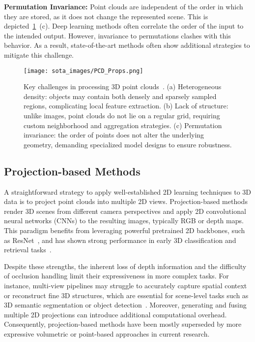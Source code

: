 \textbf{Permutation Invariance:} Point clouds are independent of the order
in which they are stored, as it does not change the represented scene.
This is depicted~\ref{fig:pcd_props}~(c).
Deep learning methods often correlate the order of the input to the
intended output. However, invariance to permutations clashes with this
behavior. As a result, state-of-the-art methods often show additional
strategies to mitigate this challenge.

\begin{figure}[t]
    \centering
    \texttt{[image: sota\_images/PCD\_Props.png]}
    \caption{Key challenges in processing 3D point clouds~\cite{bello2020deep}.
        (a) Heterogeneous density: objects may contain both densely and sparsely sampled regions,
        complicating local feature extraction.
        (b) Lack of structure: unlike images, point clouds do not lie on a regular grid,
        requiring custom neighborhood and aggregation strategies.
        (c) Permutation invariance: the order of points does not alter the underlying geometry,
        demanding specialized model designs to ensure robustness.}\label{fig:pcd_props}
\end{figure}

\subsection{Projection-based Methods}
A straightforward strategy to apply well-established 2D learning techniques to
3D data is to project point clouds into multiple 2D views.
%
Projection-based methods render 3D scenes from different camera perspectives
and apply 2D convolutional neural networks (CNNs) to the resulting images,
typically RGB or depth maps. This paradigm benefits from leveraging powerful
pretrained 2D backbones, such as ResNet~\cite{he2015deep}, and has shown strong
performance in early 3D classification and retrieval
tasks~\cite{su2015multi,feng2018gvcnn,yang2019learning,lawin2017deep,lyu2020learning}.
%

Despite these strengths, the inherent loss of depth information and the
difficulty of occlusion handling limit their expressiveness in more complex
tasks. For instance, multi-view pipelines may struggle to accurately capture
spatial context or reconstruct fine 3D structures, which are essential for
scene-level tasks such as 3D semantic segmentation or object
detection~\cite{guo2020deep}.
%
Moreover, generating and fusing multiple 2D projections can introduce
additional computational overhead.
%
Consequently, projection-based methods have been mostly superseded by more
expressive volumetric or point-based approaches in current research.

